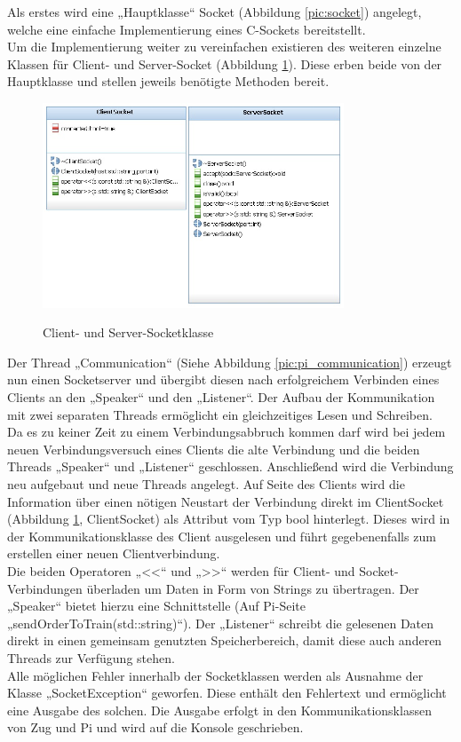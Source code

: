Als erstes wird eine „Hauptklasse“ Socket (Abbildung \ref{pic:socket}) angelegt, welche eine einfache Implementierung eines C-Sockets bereitstellt.\\
Um die Implementierung weiter zu vereinfachen existieren des weiteren einzelne Klassen für Client- und Server-Socket (Abbildung \ref{pic:server_client}). Diese erben beide von der Hauptklasse und stellen jeweils benötigte Methoden bereit. \\
\begin{figure}
	\caption{Client- und Server-Socketklasse}
	\includegraphics[width=0.8\textwidth]{content/pictures/socket/server_client_socket.jpg}
	\label{pic:server_client}
\end{figure}
Der Thread „Communication“ (Siehe Abbildung \ref{pic:pi_communication}) erzeugt nun einen Socketserver und übergibt diesen nach erfolgreichem Verbinden eines Clients an den „Speaker“ und den „Listener“. Der Aufbau der Kommunikation mit zwei separaten Threads ermöglicht ein gleichzeitiges Lesen und Schreiben.\\
Da es zu keiner Zeit zu einem Verbindungsabbruch kommen darf wird bei jedem neuen Verbindungsversuch eines Clients die alte Verbindung und die beiden Threads „Speaker“ und „Listener“ geschlossen. Anschließend wird die Verbindung neu aufgebaut und neue Threads angelegt. Auf Seite des Clients wird die Information über einen nötigen Neustart der Verbindung direkt im ClientSocket (Abbildung \ref{pic:server_client}, ClientSocket) als Attribut vom Typ bool hinterlegt. Dieses wird in der Kommunikationsklasse des Client ausgelesen und führt gegebenenfalls zum erstellen einer neuen Clientverbindung.\\
Die beiden Operatoren  „<<“ und „>>“ werden für Client- und Socket-Verbindungen überladen um Daten in Form von Strings zu übertragen. Der „Speaker“ bietet hierzu eine Schnittstelle (Auf Pi-Seite „sendOrderToTrain(std::string)“). Der „Listener“ schreibt die gelesenen Daten direkt in einen gemeinsam genutzten Speicherbereich, damit diese auch anderen Threads zur Verfügung stehen.\\
Alle möglichen Fehler innerhalb der Socketklassen werden als Ausnahme der Klasse „SocketException“ geworfen. Diese enthält den Fehlertext und ermöglicht eine Ausgabe des solchen. Die Ausgabe erfolgt in den Kommunikationsklassen von Zug und Pi und wird auf die Konsole geschrieben.





